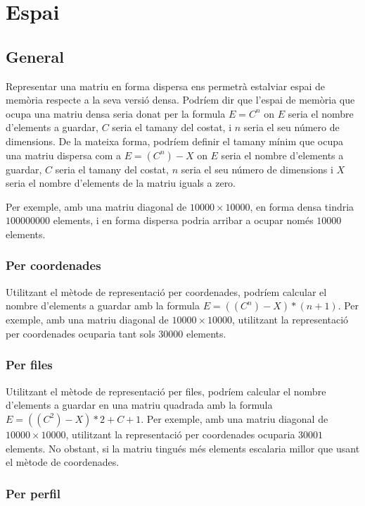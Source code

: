 \documentclass[11pt,a4paper,twoside]{report}
\begin{document}
\section{Espai}

\subsection{General}

Representar una matriu en forma dispersa ens permetrà estalviar espai de memòria respecte a la seva versió densa.
Podríem dir que l'espai de memòria que ocupa una matriu densa seria donat per la formula $E=C^n$ on $E$ seria el nombre d'elements a guardar, $C$ seria el tamany del costat, i $n$ seria el seu número de dimensions.
De la mateixa forma, podríem definir el tamany mínim que ocupa una matriu dispersa com a $E=(C^n)-X$ on $E$ seria el nombre d'elements a guardar, $C$ seria el tamany del costat, $n$ seria el seu número de dimensions i $X$ seria el nombre d'elements de la matriu iguals a zero.


Per exemple, amb una matriu diagonal de $10000 \times 10000$, en forma densa tindria $100000000$ elements, i en forma dispersa podria arribar a ocupar només $10000$ elements.
\subsubsection{Per coordenades}

Utilitzant el mètode de representació per coordenades, podríem calcular el nombre d'elements a guardar amb la formula $E=((C^n)-X)*(n+1)$.
Per exemple, amb una matriu diagonal de $10000 \times 10000$, utilitzant la representació per coordenades ocuparia tant sols $30000$ elements.

\subsubsection{Per files}

Utilitzant el mètode de representació per files, podríem calcular el nombre d'elements a guardar en una matriu quadrada  amb la formula $E=((C^2)-X)*2+C+1$.
Per exemple, amb una matriu diagonal de $10000 \times 10000$, utilitzant la representació per coordenades ocuparia $30001$ elements. No obstant, si la matriu tingués més elements
escalaria millor que usant el mètode de coordenades.

\subsubsection{Per perfil}
\end{document}
